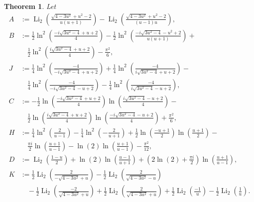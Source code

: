 \documentclass[12pt]{article}
\newtheorem{theorem}{Theorem}
\begin{document}
\begin{theorem}\label{maintheorem}
 Let 
\begin{align*}
 A & := \operatorname{Li}_2\left(\frac{\sqrt{4 - 3u^2} + u^2 - 2}{u (u + 1)}\right) 
 - \operatorname{Li}_2\left(\frac{\sqrt{4 - 3u^2} + u^2 - 2}{(u - 1) u}\right), \\ 
 B & := 
 \frac{1}{2} \ln^2\left(\frac{-i \sqrt{3 u^2-4}+u+2}{4} \right) - 
 \frac{1}{2} \ln ^2\left(\frac{- i \sqrt{3 u^2 - 4} - u^2 +2}{u 
 (u+1)}\right) + \\ 
 & \quad \frac{1}{2} \ln ^2\left(\frac{i \sqrt{3 u^2 - 4} + u + 2}{4} \right)-\frac{\pi ^2}{6}, \\ 
 J & := \frac{1}{4} \ln^2 \left( \frac{-4}{-i \sqrt{3 u^2 - 4} + u + 2} \right) + 
 \frac{1}{4} \ln^2 \left( \frac{-4}{i \sqrt{3 u^2 - 4} + u + 2} \right) - \\ 
 &\quad \frac{1}{4} \ln^2 \left( \frac{-4}{-i \sqrt{3 u^2 - 4} - u + 2} \right) - \frac{1}{4} 
 \ln^2 \left( \frac{-4}{i \sqrt{3 u^2 - 4} - u + 2} \right), \\ 
 C & := - \frac{1}{2} \ln \left( \frac{ - i \sqrt{3 u^2 - 4} + u + 
 2}{4} \right) \ln \left( \frac{ i \sqrt{3 u^2 - 4} - u + 2}{4} \right) - \\ 
 & \quad \frac{1}{2} \ln \left( \frac{i \sqrt{3 u^2 - 4} + u + 2}{4} \right) 
 \ln \left( \frac{- i \sqrt{3 u^2 - 4} - u + 2}{4} \right) + \frac{\pi^2}{6}, \\ 
 H & := 
 \frac{1}{4} \ln^2\left(\frac{2}{u-1}\right)-\frac{1}{4} \ln ^2\left(-\frac{2}{u+1}\right)+\frac{1}{2} \ln \left(\frac{-u + 1}{2} \right) 
 \ln \left(\frac{u+1}{2}\right) - \\ 
 & \quad \frac{\pi i}{2} \ln \left(\frac{u + 
 1}{u-1}\right)-\ln (2) \ln \left(\frac{u+1}{u-1}\right)-\frac{\pi^2}{12}, \\ 
 D & := \operatorname{Li}_2 \left( \frac{1 - u}{2} \right) 
 + \ln(2) \ln \left( \frac{u - 1}{u + 1} \right) + \left( 2 \ln(2) + \frac{\pi i}{2} \right) \ln \left( \frac{u + 
 1}{u - 1} \right), \\ 
 K & := \frac{1}{2} \operatorname{Li}_2 \left( \frac{2}{- \sqrt{4 - 3 u^2} + u} \right) - 
 \frac{1}{2} \operatorname{Li}_2 \left( \frac{2}{\sqrt{4 - 3 u^2} - u} \right) \\ 
 &\quad - \frac{1}{2} \operatorname{Li}_2 \left( \frac{-2}{\sqrt{4 - 3 u^2} + u} \right) + 
 \frac{1}{2} \operatorname{Li}_2 \left( \frac{2}{\sqrt{4 - 3 u^2} + u} \right) + 
 \frac{1}{2} \operatorname{Li}_2 \left( \frac{-1}{u} \right) - 
 \frac{1}{2} \operatorname{Li}_2 \left( \frac{1}{u} \right). 

\end{align*}
\end{theorem}
\end{document}
